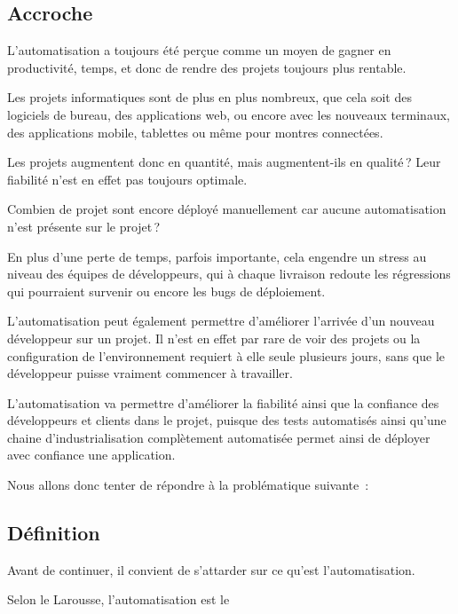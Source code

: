 

\subsection{Accroche}
L'automatisation a toujours été perçue comme un moyen de gagner en productivité, temps, et donc de rendre des projets toujours plus rentable.
	
Les projets informatiques sont de plus en plus nombreux, que cela soit des logiciels de bureau, des applications web, ou encore avec les nouveaux terminaux, des applications mobile, tablettes ou même pour montres connectées.
	
Les projets augmentent donc en quantité, mais augmentent-ils en qualité ? Leur fiabilité n'est en effet pas toujours optimale. 
	
Combien de projet sont encore déployé manuellement car aucune automatisation n'est présente sur le projet ? 
	
En plus d'une perte de temps, parfois importante, cela engendre un stress au niveau des équipes de développeurs, qui à chaque livraison redoute les régressions qui pourraient survenir ou encore les bugs de déploiement.

L'automatisation peut également permettre d'améliorer l'arrivée d'un nouveau développeur sur un projet. Il n'est en effet par rare de voir des projets ou la configuration de l'environnement requiert à elle seule plusieurs jours, sans que le développeur puisse vraiment commencer à travailler.
	
L'automatisation va permettre d'améliorer la fiabilité ainsi que la confiance des développeurs et clients dans le projet, puisque des tests automatisés ainsi qu'une chaine d'industrialisation complètement automatisée permet ainsi de déployer avec confiance une application.
	
Nous allons donc tenter de répondre à la problématique suivante :
	
{\LARGE \problematique}

\subsection{Définition}

Avant de continuer, il convient de s'attarder sur ce qu'est l'automatisation.

Selon le Larousse, l'automatisation est le 

